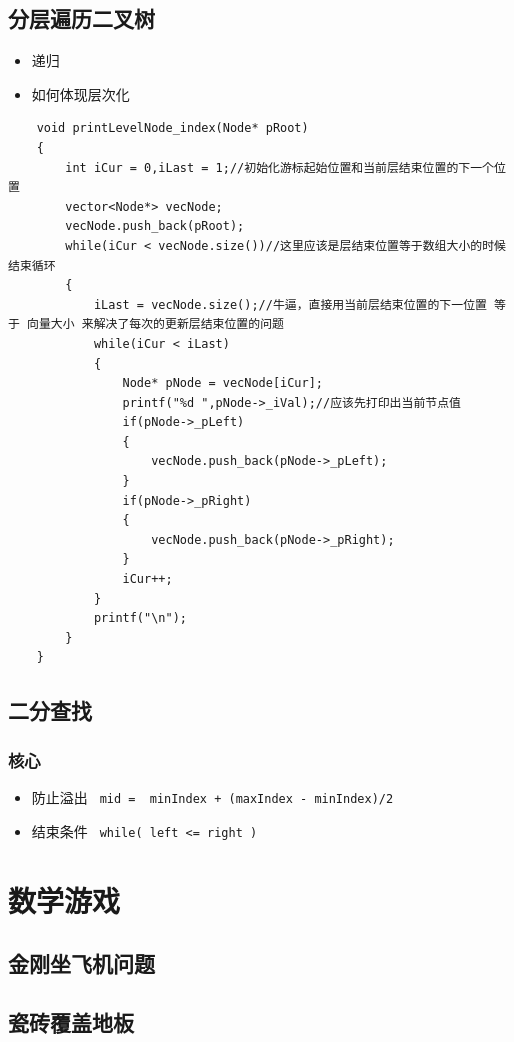 \documentclass[UTF8,a4paper,12pt]{ctexbook}
\begin{document}
		\subsection{分层遍历二叉树}
			\begin{itemize}
				\item 递归
				\item 如何体现层次化
			\end{itemize}
			
			\begin{lstlisting}
	void printLevelNode_index(Node* pRoot)  
	{  
		int iCur = 0,iLast = 1;//初始化游标起始位置和当前层结束位置的下一个位置  
		vector<Node*> vecNode;  
		vecNode.push_back(pRoot);  
		while(iCur < vecNode.size())//这里应该是层结束位置等于数组大小的时候结束循环  
		{  
			iLast = vecNode.size();//牛逼，直接用当前层结束位置的下一位置 等于 向量大小 来解决了每次的更新层结束位置的问题  
			while(iCur < iLast)  
			{  
				Node* pNode = vecNode[iCur];  
				printf("%d ",pNode->_iVal);//应该先打印出当前节点值  
				if(pNode->_pLeft)  
				{  
					vecNode.push_back(pNode->_pLeft);  
				}  
				if(pNode->_pRight)  
				{  
					vecNode.push_back(pNode->_pRight);  
				}  
				iCur++;  
			}  
			printf("\n");  
		}  
	}  
			\end{lstlisting}
			
		\subsection{二分查找}
			\subsubsection{核心}
				\begin{itemize}
					\item  防止溢出 \verb| mid =  minIndex + (maxIndex - minIndex)/2 |
					\item  结束条件 \verb| while( left <= right )|
				\end{itemize}
	
	\section{数学游戏}
		\subsection{金刚坐飞机问题}
		
		\subsection{瓷砖覆盖地板}
		
\end{document}
